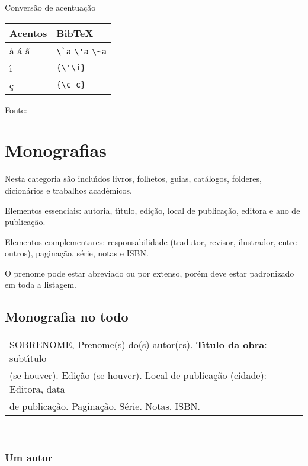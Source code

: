 \begin{quadro}[H]
	\caption{\label{quadro-acentos}Convers\~ao de acentua\c{c}\~ao}
		\begin{tabular}{|p{7.5cm}|p{7.5cm}|}
			\hline
			\textbf{Acentos} & \textbf{BibTeX}\\
			\hline
			\`a \'a \~a & \verb+\`a+ \verb+\'a+ \verb+\~a+\\
			\hline
			\'{\i} & \verb+{\'\i}+\\
			\hline
			\c{c} & \verb+{\c c}+\\
			\hline
		\end{tabular}
		\begin{flushleft}
			Fonte: 
		\end{flushleft}	
\end{quadro}


\section{Monografias}

Nesta categoria s\~ao inclu\'{\i}dos livros, folhetos, guias, cat\'alogos, folderes, dicion\'arios e trabalhos acad\^emicos.

Elementos essenciais: autoria, t\'{\i}tulo, edi\c{c}\~ao, local de publica\c{c}\~ao, editora e ano de publica\c{c}\~ao.

Elementos complementares: responsabilidade (tradutor, revisor, ilustrador, entre outros), pagina\c{c}\~ao, s\'erie, notas e ISBN.

O prenome pode estar abreviado ou por extenso, por\'em deve estar padronizado em toda a listagem. \\

\subsection{Monografia no todo}

\begin{tabular}{|l|c|} \hline
SOBRENOME, Prenome(s) do(s) autor(es). \textbf{T\'{\i}tulo da obra}: subt\'{\i}tulo \\ (se houver). Edi\c{c}\~ao (se houver). Local de publica\c{c}\~ao (cidade):	Editora, data \\
de publica\c{c}\~ao.  Pagina\c{c}\~ao. S\'erie. Notas. ISBN.\\\hline
\end{tabular}\\

\subsubsection{Um autor}

